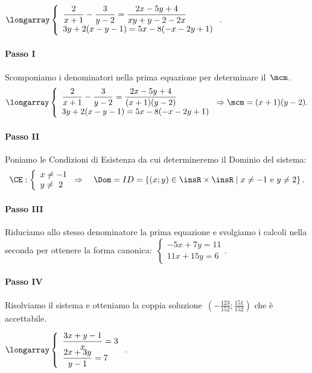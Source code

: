 \begin{exrig}
 \begin{esempio}
$\longarray\left\{\begin{array}{l}\dfrac{2}{x+1}-\dfrac{3}{y-2}=\dfrac{2x-5y+4}{xy+y-2-2x}\\3y+2(x-y-1)=5x-8(-x-2y+1)\end{array}\right..$

\paragraph{Passo I} Scomponiamo i denominatori nella prima equazione
per determinare il~$\mcm$.
\[\longarray\left\{\begin{array}{l}{\dfrac{2}{x+1}-\dfrac{3}{y-2}=\dfrac{2x-5y+4}{(x+1)(y-2)}}\\{3y+2(x-y-1)=5x-8(-x-2y+1)}\end{array}\right.\Rightarrow\mcm=(x+1)(y-2).\]

\paragraph{Passo II} Poniamo le Condizioni di Esistenza da cui determineremo il Dominio del
sistema:
\[\CE:\left\{\begin{array}{l}
   x\neq -1\\y\neq~2	
   \end{array}\right.\Rightarrow\quad \Dom=ID=\left\{(x;y)\in \insR\times\insR\mid x\neq -1\text{ e }y\neq 2\right\}.\]

\paragraph{Passo III} Riduciamo allo stesso denominatore la prima
equazione e svolgiamo i calcoli nella seconda per ottenere la forma
canonica:~$\left\{\begin{array}{l}{-5x+7y=11}\\{11x+15y=6}\end{array}\right..$

\paragraph{Passo IV} Risolviamo il sistema e otteniamo la coppia
soluzione~$\left(-{\frac{123}{152};\frac{151}{152}}\right)$ che è
accettabile.
 \end{esempio}

  \begin{esempio}
$\longarray\left\{\begin{array}{l}{\dfrac{3x+y-1}{x}=3}\\{\dfrac{2x+3y}{y-1}=7}\end{array}\right..$


\end{esempio}
\end{exrig}
